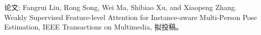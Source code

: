 \begin{submittedwork}
	论文: Fangrui Liu, Rong Song, Wei Ma, Shibiao Xu, and Xiaopeng Zhang. Weakly Supervised Feature-level Attention for Instance-aware Multi-Person Pose Estimation, IEEE Transactions on Multimedia, 拟投稿。
\end{submittedwork}